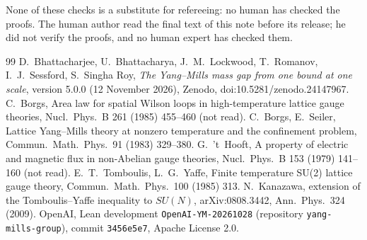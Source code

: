 \documentclass[11pt,a4paper]{article}
\theoremstyle{plain}
\theoremstyle{definition}
\theoremstyle{remark}
\numberwithin{equation}{section}
\begin{document}
None of these checks is a substitute for refereeing: no human has checked the proofs.
The human author read the final text of this note before its release; he did not verify the proofs, and no human expert has checked them.

{\small
\begin{thebibliography}{99}\setlength{\itemsep}{1pt}
 D.~Bhattacharjee, U.~Bhattacharya, J.~M.~Lockwood, T.~Romanov, I.~J.~Sessford, S.~Singha Roy, \emph{The Yang--Mills mass gap from one bound at one scale}, version 5.0.0 (12 November 2026), Zenodo, doi:10.5281/zenodo.24147967.
 C.~Borgs, Area law for spatial Wilson loops in high-temperature lattice gauge theories, Nucl.\ Phys.\ B 261 (1985) 455--460 (not read).
 C.~Borgs, E.~Seiler, Lattice Yang--Mills theory at nonzero temperature and the confinement problem, Commun.\ Math.\ Phys.\ 91 (1983) 329--380.
 G.~'t~Hooft, A property of electric and magnetic flux in non-Abelian gauge theories, Nucl.\ Phys.\ B 153 (1979) 141--160 (not read).
 E.~T.~Tomboulis, L.~G.~Yaffe, Finite temperature SU(2) lattice gauge theory, Commun.\ Math.\ Phys.\ 100 (1985) 313.
 N.~Kanazawa, extension of the Tomboulis--Yaffe inequality to $SU(N)$, arXiv:0808.3442, Ann.\ Phys.\ 324 (2009).
 OpenAI, Lean development \texttt{OpenAI-YM-20261028} (repository \texttt{yang-mills-group}), commit \texttt{3456e5e7}, Apache License 2.0.
\end{thebibliography}}
\end{document}
